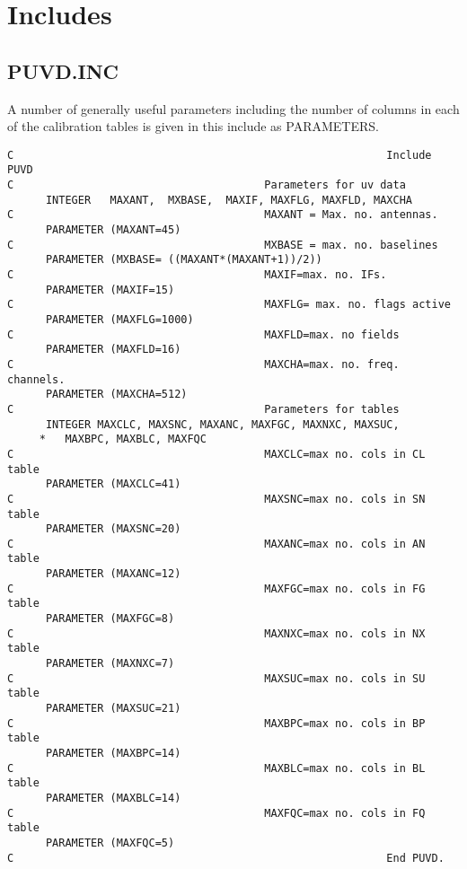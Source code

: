 \section{Includes}
\subsection{PUVD.INC}

   A number of generally useful parameters including the number of
columns in each of the calibration tables is given in this include as
PARAMETERS.
\begin{verbatim}
C                                                          Include PUVD
C                                       Parameters for uv data
      INTEGER   MAXANT,  MXBASE,  MAXIF, MAXFLG, MAXFLD, MAXCHA
C                                       MAXANT = Max. no. antennas.
      PARAMETER (MAXANT=45)
C                                       MXBASE = max. no. baselines
      PARAMETER (MXBASE= ((MAXANT*(MAXANT+1))/2))
C                                       MAXIF=max. no. IFs.
      PARAMETER (MAXIF=15)
C                                       MAXFLG= max. no. flags active
      PARAMETER (MAXFLG=1000)
C                                       MAXFLD=max. no fields
      PARAMETER (MAXFLD=16)
C                                       MAXCHA=max. no. freq. channels.
      PARAMETER (MAXCHA=512)
C                                       Parameters for tables
      INTEGER MAXCLC, MAXSNC, MAXANC, MAXFGC, MAXNXC, MAXSUC,
     *   MAXBPC, MAXBLC, MAXFQC
C                                       MAXCLC=max no. cols in CL table
      PARAMETER (MAXCLC=41)
C                                       MAXSNC=max no. cols in SN table
      PARAMETER (MAXSNC=20)
C                                       MAXANC=max no. cols in AN table
      PARAMETER (MAXANC=12)
C                                       MAXFGC=max no. cols in FG table
      PARAMETER (MAXFGC=8)
C                                       MAXNXC=max no. cols in NX table
      PARAMETER (MAXNXC=7)
C                                       MAXSUC=max no. cols in SU table
      PARAMETER (MAXSUC=21)
C                                       MAXBPC=max no. cols in BP table
      PARAMETER (MAXBPC=14)
C                                       MAXBLC=max no. cols in BL table
      PARAMETER (MAXBLC=14)
C                                       MAXFQC=max no. cols in FQ table
      PARAMETER (MAXFQC=5)
C                                                          End PUVD.
\end{verbatim}

